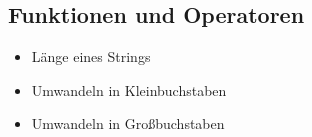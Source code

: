 
\subsection{Funktionen und Operatoren}
\begin{frame}
    \slidehead

    \begin{itemize}
        \item Länge eines Strings

        \item Umwandeln in Kleinbuchstaben

        \item Umwandeln in Großbuchstaben
    \end{itemize}
\end{frame}


